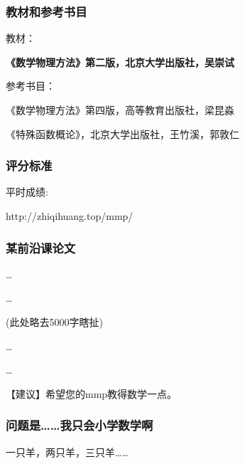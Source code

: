 \documentclass[CJK,13pt]{beamer}
\date{}
\begin{document}
  \bch
{}


\begin{frame}
\frametitle{教材和参考书目}
\emini
{}
教材：

{\bf \blue《数学物理方法》第二版，北京大学出版社，吴崇试}

\skiplines

参考书目：
\bitem
\item{《数学物理方法》第四版，高等教育出版社，梁昆淼}  
\item{《特殊函数概论》，北京大学出版社，王竹溪，郭敦仁}
\eitem
      
\emini
\end{frame}




\begin{frame}
\frametitle{评分标准}


平时成绩:

http://zhiqihuang.top/mmp/



\end{frame}

\begin{frame}
  \frametitle{某前沿课论文}
  

  
  \ldots

  \ldots  

  (此处略去5000字瞎扯)
  
  \ldots

  \ldots
  
【建议】希望您的mmp教得数学一点。

  
\end{frame}


\begin{frame}
  \frametitle{问题是……我只会小学数学啊}

      

  一只羊，两只羊，三只羊……
  
\end{frame}


\ech
\end{document}
